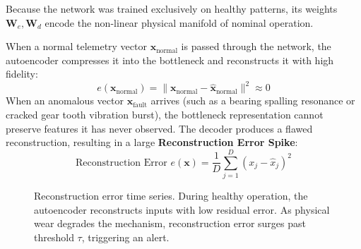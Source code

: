 Because the network was trained exclusively on healthy patterns, its weights $\mathbf{W}_e, \mathbf{W}_d$ encode the non-linear physical manifold of nominal operation.

When a normal telemetry vector $\mathbf{x}_{\text{normal}}$ is passed through the network, the autoencoder compresses it into the bottleneck and reconstructs it with high fidelity:
\begin{equation*}
e(\mathbf{x}_{\text{normal}}) = \|\mathbf{x}_{\text{normal}} - \hat{\mathbf{x}}_{\text{normal}}\|^2 \approx 0
\end{equation*}
When an anomalous vector $\mathbf{x}_{\text{fault}}$ arrives (such as a bearing spalling resonance or cracked gear tooth vibration burst), the bottleneck representation cannot preserve features it has never observed. The decoder produces a flawed reconstruction, resulting in a large \textbf{Reconstruction Error Spike}:
\begin{equation}
\text{Reconstruction Error } e(\mathbf{x}) = \frac{1}{D}\sum_{j=1}^D (x_j - \hat{x}_j)^2\label{eq:recon_error}
\end{equation}

\begin{figure}[htbp]
\centering
{}
\caption{Reconstruction error time series. During healthy operation, the autoencoder reconstructs inputs with low residual error. As physical wear degrades the mechanism, reconstruction error surges past threshold $\tau$, triggering an alert.}\label{fig:recon_error_timeseries}
\end{figure}

